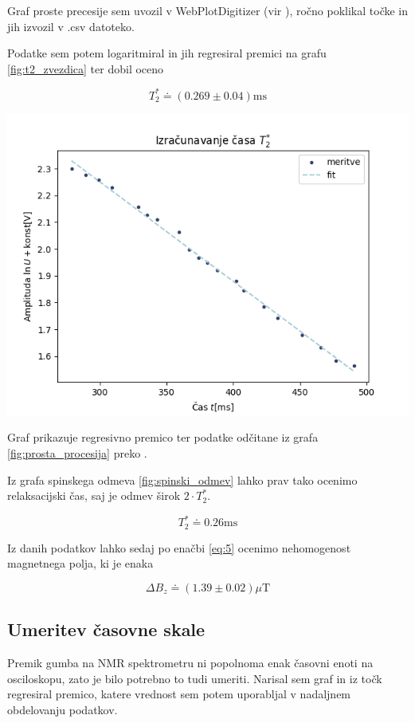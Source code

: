 \documentclass[11pt]{article}
\begin{document}
Graf proste precesije sem uvozil v WebPlotDigitizer (vir \cite{webplotdigitizer}), ročno poklikal točke in jih izvozil v .csv datoteko.

Podatke sem potem logaritmiral in jih regresiral premici na grafu \ref{fig:t2_zvezdica} ter dobil oceno

\[ T_2^{*} \doteq (0.269 \pm 0.04 ) \mathrm{ms}
\]
\begin{slika}[H]
\begin{center}
  \includegraphics[width=.9\linewidth]{figures/cas_t2_zvezdica.png}
  \caption{\small Graf prikazuje regresivno premico ter podatke odčitane iz grafa \ref{fig:prosta_procesija} preko \cite{webplotdigitizer}.}\label{fig:t2_zvezdica}
\end{center}
\end{slika}


Iz grafa spinskega odmeva \ref{fig:spinski_odmev} lahko prav tako ocenimo relaksacijski čas, saj je odmev širok \(2 \cdot T_2^{*}\).

\[ T_2^{*} \doteq 0.26 \mathrm{ms}
\]

Iz danih podatkov lahko sedaj po enačbi \ref{eq:5} ocenimo nehomogenost magnetnega polja, ki je enaka

\[ \Delta B_z \doteq (1.39 \pm 0.02) \mu \mathrm{T}
\]
\subsection{Umeritev časovne skale}\label{sec:orgd2f454d}

Premik gumba na NMR spektrometru ni popolnoma enak časovni enoti na osciloskopu, zato je bilo potrebno to tudi umeriti. Narisal sem graf in iz točk regresiral premico, katere vrednost sem potem uporabljal v nadaljnem obdelovanju podatkov.
\end{document}
